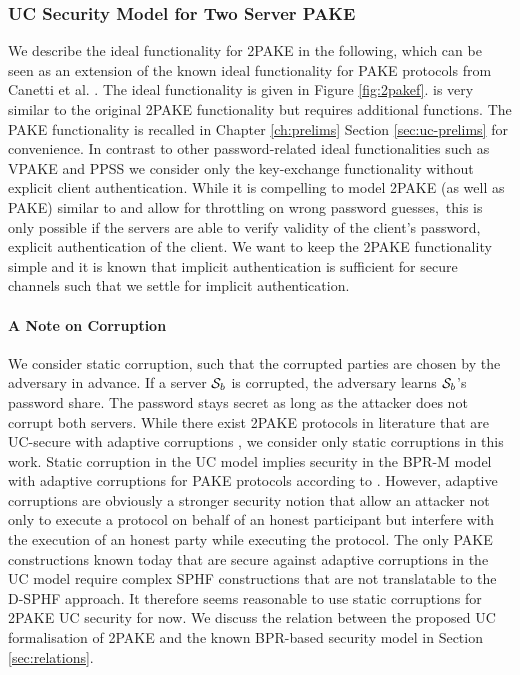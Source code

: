 \subsubsection{UC Security Model for Two Server PAKE}\label{sec:2pakesecurity}
We describe the ideal functionality for \ac{2PAKE} in the following, which can be seen as an extension of the known ideal functionality for \ac{PAKE} protocols from Canetti et al. \cite{Canetti2005}.
The ideal functionality \FTWOPAKE is given in Figure \ref{fig:2pakef}.
\FTWOPAKE is very similar to the original \ac{2PAKE} functionality but requires additional functions.
The \ac{PAKE} functionality is recalled in Chapter \ref{ch:prelims} Section \ref{sec:uc-prelims} for convenience.
In contrast to other password-related ideal functionalities such as \ac{VPAKE} \cite{Gentry2006} and \ac{PPSS} \cite{Camenisch2012} we consider only the key-exchange functionality without explicit client authentication.
While it is compelling to model \ac{2PAKE} (as well as \ac{PAKE}) similar to \cite{Camenisch2012} and allow for throttling on wrong password guesses,\footnotemark\ this is only possible if the servers are able to verify validity of the client's password, \ie explicit authentication of the client.
We want to keep the \ac{2PAKE} functionality simple and it is known that implicit authentication is sufficient for secure channels \cite{CanettiK01} such that we settle for implicit authentication.


\paragraph{A Note on Corruption}
We consider static corruption, such that the corrupted parties are chosen by the adversary in advance.
If a server $\mathcal{S}_b$ is corrupted, the adversary learns $\mathcal{S}_b$'s password share. 
The password stays secret as long as the attacker does not corrupt both servers.
While there exist \ac{2PAKE} protocols in literature that are \ac{UC}-secure with adaptive corruptions \cite{AbdallaBBCP13,AbdallaBP14a,AbdallaCCP09,AbdallaCP09}, we consider only static corruptions in this work.
Static corruption in the \ac{UC} model implies security in the \ac{BPR-M} model with adaptive corruptions for \ac{PAKE} protocols according to \citet{Canetti2005}.
However, adaptive corruptions are obviously a stronger security notion that allow an attacker not only to execute a protocol on behalf of an honest participant but interfere with the execution of an honest party while executing the protocol.
The only \ac{PAKE} constructions known today that are secure against adaptive corruptions in the \ac{UC} model require complex \ac{SPHF} constructions that are not translatable to the \ac{D-SPHF} approach.
It therefore seems reasonable to use static corruptions for \ac{2PAKE} \ac{UC} security for now.
We discuss the relation between the proposed \ac{UC} formalisation of \ac{2PAKE} and the known BPR-based security model in Section \ref{sec:relations}.

